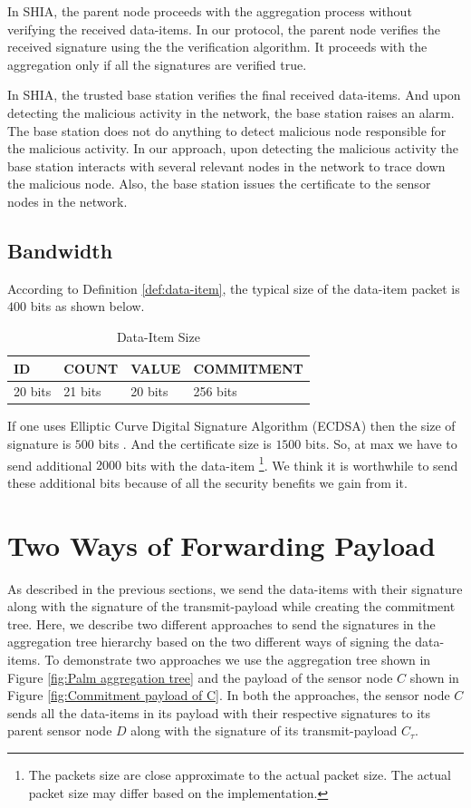 	In SHIA, the parent node proceeds with the aggregation process without verifying the received data-items.
	In our protocol, the parent node verifies the received signature using the the verification algorithm.
	It proceeds with the aggregation only if all the signatures are verified true.

	In SHIA, the trusted base station verifies the final received data-items.
	And upon detecting the malicious activity in the network, the base station raises an alarm. 
	The base station does not do anything to detect malicious node responsible for the malicious activity.
	In our approach, upon detecting the malicious activity the base station interacts with several relevant nodes in the network to trace down the malicious node.
	Also, the base station issues the certificate to the sensor nodes in the network.
	
	\subsection{Bandwidth}
	
	According to Definition \ref{def:data-item}, the typical size of the data-item packet is $400$ bits as shown below.
	\begin{table}[!htb]	
  		\caption{Data-Item Size}
  		\centering
		\begin{tabular}{ | l | l | l | l |}
			\hline
			ID & COUNT & VALUE & COMMITMENT \\
			\hline
			20 bits & 21 bits & 20 bits & 256 bits\\
			\hline
		\end{tabular}
  	\end{table}
	If one uses Elliptic Curve Digital Signature Algorithm (ECDSA) then the size of signature is $500$ bits \cite{ecdsa2009186}.
	And the certificate size is $1500$ bits.
	So, at max we have to send additional $2000$ bits with the data-item
	\footnote{ The packets size are close approximate to the actual packet size. 
	The actual packet size may differ based on the implementation.}.
	We think it is worthwhile to send these additional bits because of all the security benefits we gain from it. 

\section{Two Ways of Forwarding Payload}	
	
	As described in the previous sections, we send the data-items with their signature along with the signature of the transmit-payload while creating the commitment tree.
	Here, we describe two different approaches to send the signatures in the aggregation tree hierarchy based on the two different ways of signing the data-items.
	To demonstrate two approaches we use the aggregation tree shown in Figure \ref{fig:Palm aggregation tree} and the payload of the sensor node $C$ shown in Figure \ref{fig:Commitment payload of C}.
	In both the approaches, the sensor node $C$ sends all the data-items in its payload with their respective signatures to its parent sensor node $D$ along with the signature of its transmit-payload $C_{\tau}$.

